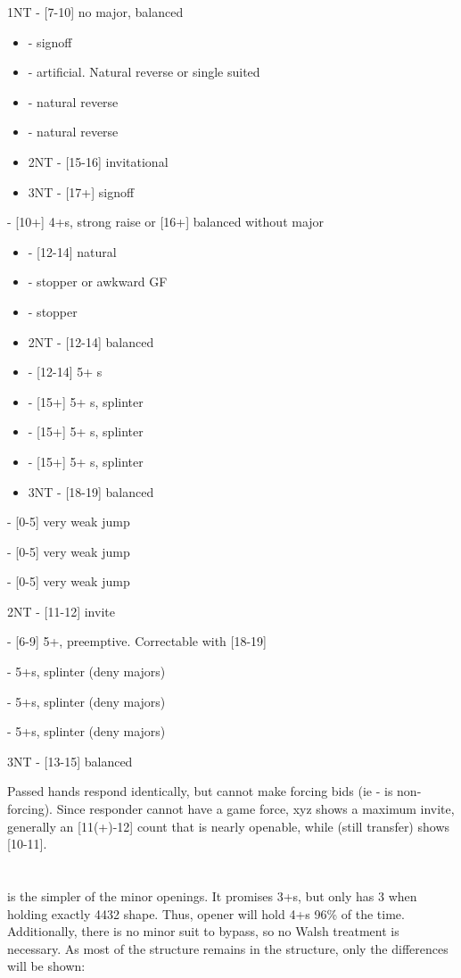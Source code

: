 \documentclass[12pt]{report}
\newcommand{\q}[1]{\multido{}{#1}{\qquad}}
\newcommand{\ul}[1]{\begin{itemize}#1\end{itemize}}
\newcommand{\li}[1]{\item[~] \q{#1}}
\newcommand{\bidsection}[2]{\section{\texorpdfstring{#1}{#2}}}
\begin{document}
\begin{center}
{        \li0 1NT - [7-10] no major, balanced \ul{
            \li0  - signoff
            \li0  - artificial.  Natural reverse or single suited
            \li0 \he2 - natural reverse
            \li0 \sp2 - natural reverse
            \li0 2NT - [15-16] invitational
            \li0 3NT - [17+] signoff
        }
        
        \li0  - [10+] 4+\cl{}s, strong raise or [16+] balanced without major \ul{
            \li0  - [12-14] natural
            \li0 \he2 - stopper or awkward GF
            \li0 \sp2 - stopper
            \li0 2NT - [12-14] balanced
            \li0 \cl3 - [12-14] 5+ \cl{}s
            \li0 \di3 - [15+] 5+ \cl{}s, splinter
            \li0 \he3 - [15+] 5+ \cl{}s, splinter
            \li0 \sp3 - [15+] 5+ \cl{}s, splinter
            \li0 3NT - [18-19] balanced
        }

        \li0  - [0-5] very weak jump
        \li0  - [0-5] very weak jump
        \li0  - [0-5] very weak jump
        \li0 2NT - [11-12] invite
        \li0  - [6-9] 5+\cl{}, preemptive.  Correctable with [18-19]
        \li0  - 5+\cl{}s, splinter (deny majors)
        \li0  - 5+\cl{}s, splinter (deny majors)
        \li0  - 5+\cl{}s, splinter (deny majors)
        \li0 3NT - [13-15] balanced
    }

    Passed hands respond identically, but cannot make forcing bids (ie - is non-forcing).  Since responder cannot have a game force, xyz  shows a maximum invite, generally an [11(+)-12] count that is nearly openable, while  (still transfer) shows [10-11].

\bidsection{}{1♢} \label{2:3}

     is the simpler of the minor openings.  It promises 3+\di{}s, but only has 3 when holding exactly 4432 shape.  Thus, opener will hold 4+\di{}s 96\% of the time.  Additionally, there is no minor suit to bypass, so no Walsh treatment is necessary.  As most of the  structure remains in the  structure, only the differences will be shown:


\end{center}
\end{document}
